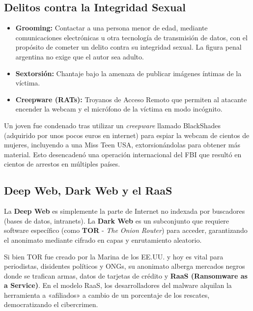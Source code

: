 \documentclass[11pt,a4paper]{article}
\begin{document}
\subsection{Delitos contra la Integridad Sexual}
\begin{itemize}[leftmargin=*]
  \item \textbf{Grooming:} Contactar a una persona menor de edad, mediante comunicaciones electrónicas u otra tecnología de transmisión de datos, con el propósito de cometer un delito contra su integridad sexual. La figura penal argentina no exige que el autor sea adulto.
  \item \textbf{Sextorsión:} Chantaje bajo la amenaza de publicar imágenes íntimas de la víctima.
  \item \textbf{Creepware (RATs):} Troyanos de Acceso Remoto que permiten al atacante encender la webcam y el micrófono de la víctima en modo incógnito.
\end{itemize}

\begin{ejemplo}
Un joven fue condenado tras utilizar un \textit{creepware} llamado BlackShades (adquirido por unos pocos euros en internet) para espiar la webcam de cientos de mujeres, incluyendo a una Miss Teen USA, extorsionándolas para obtener más material. Esto desencadenó una operación internacional del FBI que resultó en cientos de arrestos en múltiples países.
\end{ejemplo}

\subsection{Deep Web, Dark Web y el RaaS}
La \textbf{Deep Web} es simplemente la parte de Internet no indexada por buscadores (bases de datos, intranets). La \textbf{Dark Web} es un subconjunto que requiere software específico (como \textbf{TOR} - \textit{The Onion Router}) para acceder, garantizando el anonimato mediante cifrado en capas y enrutamiento aleatorio.

Si bien TOR fue creado por la Marina de los EE.UU. y hoy es vital para periodistas, disidentes políticos y ONGs, su anonimato alberga mercados negros donde se trafican armas, datos de tarjetas de crédito y \textbf{RaaS (Ransomware as a Service)}. En el modelo RaaS, los desarrolladores del malware alquilan la herramienta a «afiliados» a cambio de un porcentaje de los rescates, democratizando el cibercrimen.

\end{document}
